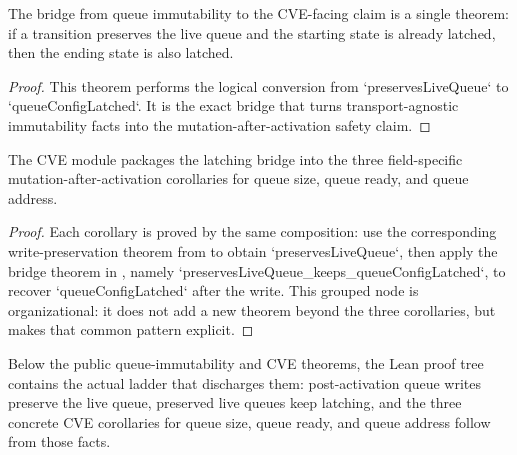 \begin{theorem}
\label{thm:latching-bridge}
\leanok
The bridge from queue immutability to the CVE-facing claim is a single theorem: if a transition preserves the live queue and the starting state is already latched, then the ending state is also latched.
\end{theorem}

\begin{proof}
\leanok
{}
This theorem performs the logical conversion from `preservesLiveQueue` to `queueConfigLatched`.
It is the exact bridge that turns transport-agnostic immutability facts into the mutation-after-activation safety claim.
\end{proof}

\begin{theorem}
\label{thm:cve-corollaries}
\leanok
The CVE module packages the latching bridge into the three field-specific mutation-after-activation corollaries for queue size, queue ready, and queue address.
\end{theorem}

\begin{proof}
\leanok
{}
Each corollary is proved by the same composition: use the corresponding write-preservation theorem from  to obtain `preservesLiveQueue`, then apply the bridge theorem in , namely `preservesLiveQueue_keeps_queueConfigLatched`, to recover `queueConfigLatched` after the write.
This grouped node is organizational: it does not add a new theorem beyond the three corollaries, but makes that common pattern explicit.
\end{proof}

\begin{theorem}
\label{thm:core-cve-internals}
\leanok
Below the public queue-immutability and CVE theorems, the Lean proof tree contains the actual ladder that discharges them: post-activation queue writes preserve the live queue, preserved live queues keep latching, and the three concrete CVE corollaries for queue size, queue ready, and queue address follow from those facts.
\end{theorem}

